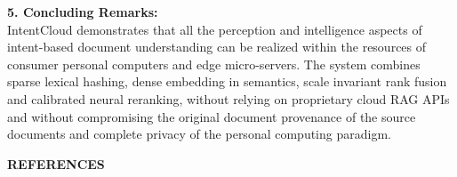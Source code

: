 \documentclass[a4paper,12pt]{article}
\begin{document}
\vspace{0.4em}
\noindent\textbf{5. Concluding Remarks:}\\
IntentCloud demonstrates that all the perception and intelligence aspects of intent-based document understanding can be realized within the resources of consumer personal computers and edge micro-servers. The system combines sparse lexical hashing, dense embedding in semantics, scale invariant rank fusion and calibrated neural reranking, without relying on proprietary cloud RAG APIs and without compromising the original document provenance of the source documents and complete privacy of the personal computing paradigm.

\clearpage
\pagestyle{clean} %

\makeatletter
\renewenvironment{thebibliography}[1]
     {\list{\@biblabel{\@arabic\c@enumiv}}%
           {\settowidth\labelwidth{\@biblabel{#1}}%
            \leftmargin\labelwidth
            \advance\leftmargin\labelsep
            \@openbib@code
            \usecounter{enumiv}%
            \let\p@enumiv\@empty
            \renewcommand\theenumiv{\@arabic\c@enumiv}}%
      \sloppy
      \clubpenalty4000
      \@clubpenalty \clubpenalty
      \widowpenalty4000%
      \sfcode`\.\@m}
     {\def\@noitemerr
       {\@latex@warning{Empty `thebibliography' environment}}%
      \endlist}
\makeatother

\vspace*{0.2cm}
{\centering\textbf{\Large REFERENCES}\par}
\vspace{1.0cm}
\end{document}
